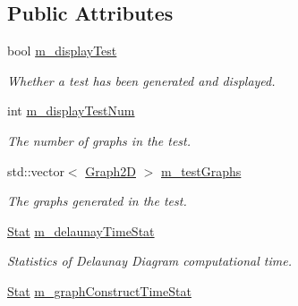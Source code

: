 \subsection*{Public Attributes}
\begin{DoxyCompactItemize}
\item 
bool \hyperlink{structcmst_1_1_window_1_1_test_a6e01140b018e7c479b15ae6499d8b9e8}{m\+\_\+display\+Test}\hypertarget{structcmst_1_1_window_1_1_test_a6e01140b018e7c479b15ae6499d8b9e8}{}\label{structcmst_1_1_window_1_1_test_a6e01140b018e7c479b15ae6499d8b9e8}

\begin{DoxyCompactList}\small\item\em Whether a test has been generated and displayed. \end{DoxyCompactList}\item 
int \hyperlink{structcmst_1_1_window_1_1_test_a0968826c727c33df28c160c4095e0b2f}{m\+\_\+display\+Test\+Num}\hypertarget{structcmst_1_1_window_1_1_test_a0968826c727c33df28c160c4095e0b2f}{}\label{structcmst_1_1_window_1_1_test_a0968826c727c33df28c160c4095e0b2f}

\begin{DoxyCompactList}\small\item\em The number of graphs in the test. \end{DoxyCompactList}\item 
std\+::vector$<$ \hyperlink{classcmst_1_1_graph2_d}{Graph2D} $>$ \hyperlink{structcmst_1_1_window_1_1_test_a42f44814c524399a3c1f547a64218c1a}{m\+\_\+test\+Graphs}\hypertarget{structcmst_1_1_window_1_1_test_a42f44814c524399a3c1f547a64218c1a}{}\label{structcmst_1_1_window_1_1_test_a42f44814c524399a3c1f547a64218c1a}

\begin{DoxyCompactList}\small\item\em The graphs generated in the test. \end{DoxyCompactList}\item 
\hyperlink{classcmst_1_1_stat}{Stat} \hyperlink{structcmst_1_1_window_1_1_test_a6f0ad01079d1c5b149282e31db771772}{m\+\_\+delaunay\+Time\+Stat}\hypertarget{structcmst_1_1_window_1_1_test_a6f0ad01079d1c5b149282e31db771772}{}\label{structcmst_1_1_window_1_1_test_a6f0ad01079d1c5b149282e31db771772}

\begin{DoxyCompactList}\small\item\em Statistics of Delaunay Diagram computational time. \end{DoxyCompactList}\item 
\hyperlink{classcmst_1_1_stat}{Stat} \hyperlink{structcmst_1_1_window_1_1_test_a4ff72191889ff43d7d80517120a97fae}{m\+\_\+graph\+Construct\+Time\+Stat}\hypertarget{structcmst_1_1_window_1_1_test_a4ff72191889ff43d7d80517120a97fae}{}\label{structcmst_1_1_window_1_1_test_a4ff72191889ff43d7d80517120a97fae}


\end{DoxyCompactItemize}
